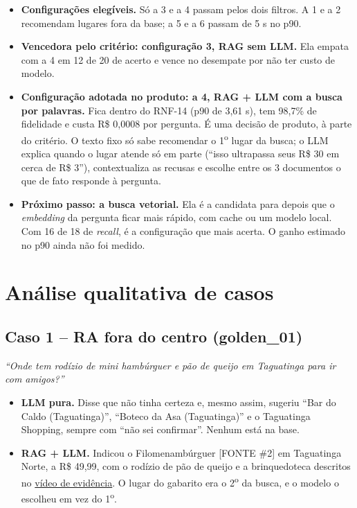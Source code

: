 \documentclass[11pt,a4paper]{article}
\begin{document}
\begin{itemize}
\item \textbf{Configurações elegíveis.} Só a 3 e a 4 passam pelos dois filtros. A 1 e a 2 recomendam lugares fora da base; a 5 e a 6 passam de 5 s no p90.
\item \textbf{Vencedora pelo critério: configuração 3, RAG sem LLM.} Ela empata com a 4 em 12 de 20 de acerto e vence no desempate por não ter custo de modelo.
\item \textbf{Configuração adotada no produto: a 4, RAG + LLM com a busca por palavras.} Fica dentro do RNF-14 (p90 de 3,61 s), tem 98,7\% de fidelidade e custa R\$ 0,0008 por pergunta. É uma decisão de produto, à parte do critério. O texto fixo só sabe recomendar o 1\textsuperscript{o} lugar da busca; o LLM explica quando o lugar atende só em parte (``isso ultrapassa seus R\$ 30 em cerca de R\$ 3''), contextualiza as recusas e escolhe entre os 3 documentos o que de fato responde à pergunta.
\item \textbf{Próximo passo: a busca vetorial.} Ela é a candidata para depois que o \textit{embedding} da pergunta ficar mais rápido, com cache ou um modelo local. Com 16 de 18 de \textit{recall}, é a configuração que mais acerta. O ganho estimado no p90 ainda não foi medido.
\end{itemize}

\section{Análise qualitativa de casos}
\label{sec:casos}

\subsection{Caso 1 -- RA fora do centro (golden\_01)}

\textit{``Onde tem rodízio de mini hambúrguer e pão de queijo em Taguatinga para ir com amigos?''}

\begin{itemize}
\item \textbf{LLM pura.} Disse que não tinha certeza e, mesmo assim, sugeriu ``Bar do Caldo (Taguatinga)'', ``Boteco da Asa (Taguatinga)'' e o Taguatinga Shopping, sempre com ``não sei confirmar''. Nenhum está na base.
\item \textbf{RAG + LLM.} Indicou o Filomenambúrguer [FONTE \#2] em Taguatinga Norte, a R\$ 49,99, com o rodízio de pão de queijo e a brinquedoteca descritos no \href{https://www.tiktok.com/@rolezandoembrasilia/video/7626405885388197128}{vídeo de evidência}. O lugar do gabarito era o 2\textsuperscript{o} da busca, e o modelo o escolheu em vez do 1\textsuperscript{o}.
\end{itemize}
\end{document}
